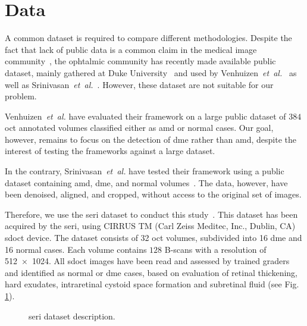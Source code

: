 \graphicspath{ {./content/method/figures/} }

\section{Data}\label{sec:data}
A common dataset is required to compare different methodologies.
Despite the fact that lack of public data is a common claim in the medical image community~\cite{giger2008anniversary}, the ophtalmic community has recently made available public dataset, mainly gathered at Duke University~\cite{farsiu2014quantitative,Srinivasan2014} and used by Venhuizen~\emph{et~al.}~\cite{Venhuizen2015} as well as Srinivasan~\emph{et~al.}~\cite{Srinivasan2014}.
However, these dataset are not suitable for our problem.

Venhuizen~\emph{et~al.} have evaluated their framework on a large public dataset of $384$ \gls{oct} annotated volumes classified either as \gls{amd} or normal cases.
Our goal, however, remains to focus on the detection of \gls{dme} rather than \gls{amd}, despite the interest of testing the frameworks against a large dataset.

In the contrary, Srinivasan~\emph{et~al.} have tested their framework using a public dataset containing \gls{amd}, \gls{dme}, and normal volumes~\cite{Srinivasan2014}.
The data, however, have been denoised, aligned, and cropped, without access to the original set of images.

Therefore, we use the \gls{seri} dataset to conduct this study~\cite{seri2016apr-repoICPR}.
This dataset has been acquired by the \gls{seri}, using CIRRUS TM (Carl Zeiss Meditec, Inc., Dublin, CA) \gls{sdoct} device.
The dataset consists of 32 \gls{oct} volumes, subdivided into 16 \gls{dme} and 16 normal cases.
Each volume contains $128$ B-scans with a resolution of \SI[product-units=repeat]{512x1024}{\px}.
All \gls{sdoct} images have been read and assessed by trained graders and identified as normal or \gls{dme} cases, based on evaluation of retinal thickening, hard exudates, intraretinal cystoid space formation and subretinal fluid (see Fig.\,\ref{fig:bbdd}).

\begin{figure}
    \caption{\gls{seri} dataset description.}
  \label{fig:bbdd}
\end{figure}
